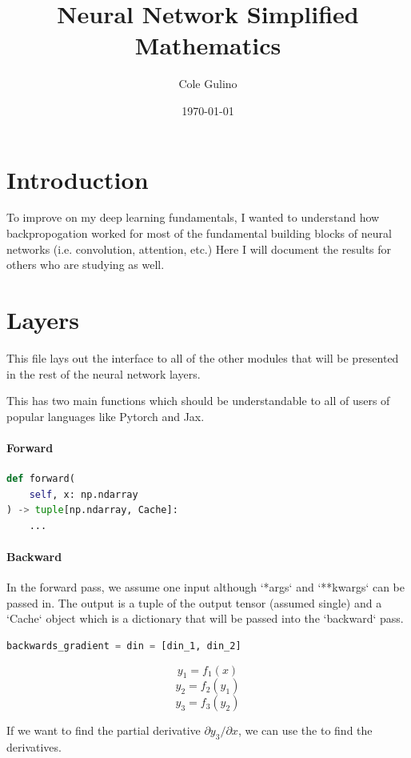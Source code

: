 \documentclass{article}
\title{Neural Network Simplified Mathematics}
\author{Cole Gulino}
\date{\today} %
\begin{document}
\maketitle %

\section{Introduction}
To improve on my deep learning fundamentals, I wanted to understand how backpropogation worked for 
most of the fundamental building blocks of neural networks (i.e. convolution, attention, etc.) Here 
I will document the results for others who are studying as well.

\section{Layers}
This file lays out the interface to all of the other modules
that will be presented in the rest of the neural network layers.

This has two main functions which should be understandable to all of users of popular languages like 
Pytorch and Jax.

\paragraph*{Forward}

\begin{lstlisting}[language=Python]
def forward(
    self, x: np.ndarray
) -> tuple[np.ndarray, Cache]:
    ...
\end{lstlisting}

\paragraph*{Backward}

In the forward pass, we assume one input although `*args` and 
`**kwargs` can be passed in. The output is a tuple of the output 
tensor (assumed single) and a `Cache` object which is a dictionary 
that will be passed into the `backward` pass.

\begin{lstlisting}[language=Python]
    backwards_gradient = din = [din_1, din_2]
\end{lstlisting}    

$$
y_1 = f_1(x)
$$
$$
y_2 = f_2(y_1)
$$
$$
y_3 = f_3(y_2)
$$

If we want to find the partial derivative $\partial y_3 / \partial 
x$, we can use the to find the derivatives.
\end{document}
